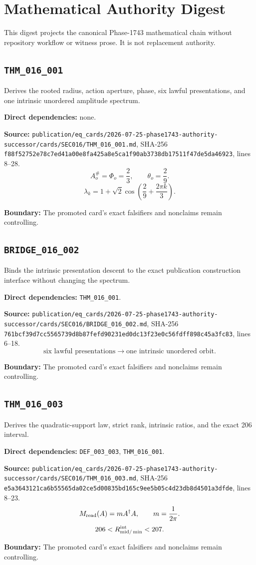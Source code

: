 \section*{Mathematical Authority Digest}
This digest projects the canonical Phase-1743 mathematical chain without repository workflow or witness prose. It is not replacement authority.
\subsection*{\texttt{THM_016_001}}
Derives the rooted radius, action aperture, phase, six lawful presentations, and one intrinsic unordered amplitude spectrum.
\par\noindent\textbf{Direct dependencies:} none.
\par\noindent\textbf{Source:} \texttt{publication/eq_cards/2026-07-25-phase1743-authority-successor/cards/SEC016/THM_016_001.md}, SHA-256 \texttt{f88f52752e78c7ed41a00e8fa425a8e5ca1f90ab3738db17511f47de5da46923}, lines 8--28.
\[A_o^\#=\Phi_o=\frac23,\qquad \theta_o=\frac29.\]
\[\lambda_k=1+\sqrt2\cos\left(\frac29+\frac{2\pi k}{3}\right).\]
\par\noindent\textbf{Boundary:} The promoted card's exact falsifiers and nonclaims remain controlling.
\subsection*{\texttt{BRIDGE_016_002}}
Binds the intrinsic presentation descent to the exact publication construction interface without changing the spectrum.
\par\noindent\textbf{Direct dependencies:} \texttt{THM_016_001}.
\par\noindent\textbf{Source:} \texttt{publication/eq_cards/2026-07-25-phase1743-authority-successor/cards/SEC016/BRIDGE_016_002.md}, SHA-256 \texttt{761bcf39d7cc5565739d8b87fefd90231ed0dc13f23e0c56fdff898c45a3fc83}, lines 6--18.
\[\text{six lawful presentations}\longrightarrow\text{one intrinsic unordered orbit}.\]
\par\noindent\textbf{Boundary:} The promoted card's exact falsifiers and nonclaims remain controlling.
\subsection*{\texttt{THM_016_003}}
Derives the quadratic-support law, strict rank, intrinsic ratios, and the exact 206 interval.
\par\noindent\textbf{Direct dependencies:} \texttt{DEF_003_003}, \texttt{THM_016_001}.
\par\noindent\textbf{Source:} \texttt{publication/eq_cards/2026-07-25-phase1743-authority-successor/cards/SEC016/THM_016_003.md}, SHA-256 \texttt{e5a3643121ca6b55565da02ce5d00835bd165c9ee5b05c4d23db8d4501a3dfde}, lines 8--23.
\[M_{\rm read}(A)=mA^\dagger A,\qquad m=\frac1{2\pi}.\]
\[206<R_{\rm mid/\min}^{\rm int}<207.\]
\par\noindent\textbf{Boundary:} The promoted card's exact falsifiers and nonclaims remain controlling.
